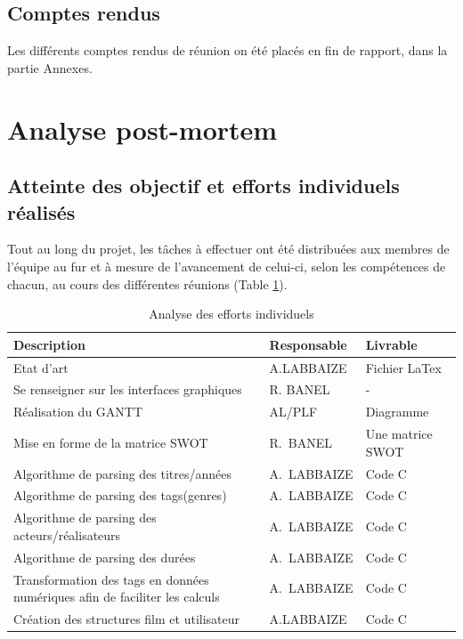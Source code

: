\documentclass[light]{ceri}
\begin{document}
\subsection{Comptes rendus}

Les différents comptes rendus de réunion on été placés en fin de rapport, dans la partie Annexes.

\section{Analyse post-mortem}


\subsection{Atteinte des objectif et efforts individuels réalisés}




Tout au long du projet, les tâches à effectuer ont été distribuées aux membres de l'équipe au fur et à mesure de l'avancement de celui-ci, selon les compétences de chacun, au cours des différentes réunions (Table \ref{table:efforts}).



\begin{table}[h]

    \centering
    \begin{tabular}{|p{4cm}|p{4cm}|p{4cm}|}
    \hline
        \rowcolor{yellow} Description  & Responsable  & Livrable \tabularnewline \hline
        Etat d'art & A.LABBAIZE & Fichier LaTex \tabularnewline \hline
        Se renseigner sur les interfaces graphiques & R. BANEL & - \tabularnewline \hline
        Réalisation du GANTT  & AL/PLF & Diagramme \tabularnewline \hline 
        Mise en forme de la matrice SWOT & R.~BANEL & Une matrice SWOT \tabularnewline \hline
        Algorithme de parsing des titres/années  & A.~LABBAIZE & Code C \tabularnewline \hline
        Algorithme de parsing des tags(genres)  & A.~LABBAIZE & Code C \tabularnewline \hline
         Algorithme de parsing des acteurs/réalisateurs  & A.~LABBAIZE & Code C \tabularnewline \hline
         Algorithme de parsing des durées  & A.~LABBAIZE & Code C \tabularnewline \hline
                Transformation des tags en données numériques afin de faciliter les calculs  & A.~LABBAIZE & Code C \tabularnewline \hline
         Création des structures film et utilisateur &  A.LABBAIZE & Code C\tabularnewline \hline

         
    \end{tabular}
    \caption{Analyse des efforts individuels}
    \label{table:efforts}
\end{table}
\end{document}
